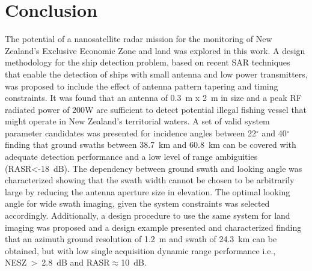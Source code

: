 \documentclass[conference,a4paper]{IEEEtran}
\begin{document}
    \section{Conclusion}
    \label{sec:conclusion}
    The potential of a nanosatellite radar mission for the monitoring of New Zealand's Exclusive Economic Zone and land was explored in this work.
    A design methodology for the ship detection problem, based on recent SAR techniques that enable the detection of ships with small antenna and low power transmitters, was proposed to include the effect of antenna pattern tapering and timing constraints.
    It was found that an antenna of 0.3~m x 2~m in size and a peak RF radiated power of 200W are sufficient to detect potential illegal fishing vessel that might operate in New Zealand's territorial waters.
    A set of valid system parameter candidates was presented for incidence angles between 22$^\circ$ and 40$^\circ$ finding that ground swaths between 38.7~km and 60.8~km can be covered with adequate detection performance and a low level of range ambiguities (RASR<-18~dB).
    The dependency between ground swath and looking angle was characterized showing that the swath width cannot be chosen to be arbitrarily large by reducing the antenna aperture size in elevation.
    The optimal looking angle for wide swath imaging, given the system constraints was selected accordingly.
    Additionally, a design procedure to use the same system for land imaging was proposed and a design example presented and characterized finding that an azimuth ground resolution of 1.2~m and swath of 24.3~km can be obtained, but with low single acquisition dynamic range performance i.e., NESZ~>~2.8~dB and RASR$\approx$10~dB.\\





%
%
%
    
    

    \color{red}
\end{document}
